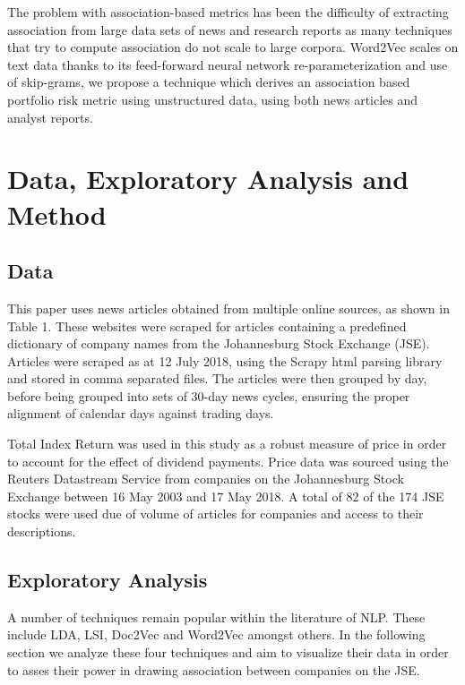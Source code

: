 \documentclass[11pt]{article}
\begin{document}
The problem with association-based metrics has been the difficulty of
extracting association from large data sets of news and research reports
as many techniques that try to compute association do not scale to large
corpora. Word2Vec scales on text data thanks to its feed-forward neural
network re-parameterization and use of skip-grams, we propose a
technique which derives an association based portfolio risk metric using
unstructured data, using both news articles and analyst reports.

\hypertarget{data-exploratory-analysis-and-method}{%
\section{Data, Exploratory Analysis and
Method}\label{data-exploratory-analysis-and-method}}

\hypertarget{data}{%
\subsection{Data}\label{data}}

This paper uses news articles obtained from multiple online sources, as
shown in Table 1. These websites were scraped for articles containing a
predefined dictionary of company names from the Johannesburg Stock
Exchange (JSE). Articles were scraped as at 12 July 2018, using the
Scrapy html parsing library and stored in comma separated files. The
articles were then grouped by day, before being grouped into sets of
30-day news cycles, ensuring the proper alignment of calendar days
against trading days.

Total Index Return was used in this study as a robust measure of price
in order to account for the effect of dividend payments. Price data was
sourced using the Reuters Datastream Service from companies on the
Johannesburg Stock Exchange between 16 May 2003 and 17 May 2018. A total
of 82 of the 174 JSE stocks were used due of volume of articles for
companies and access to their descriptions.

\hypertarget{exploratory-analysis}{%
\subsection{Exploratory Analysis}\label{exploratory-analysis}}

A number of techniques remain popular within the literature of NLP.
These include LDA, LSI, Doc2Vec and Word2Vec amongst others. In the
following section we analyze these four techniques and aim to visualize
their data in order to asses their power in drawing association between
companies on the JSE.
\end{document}
